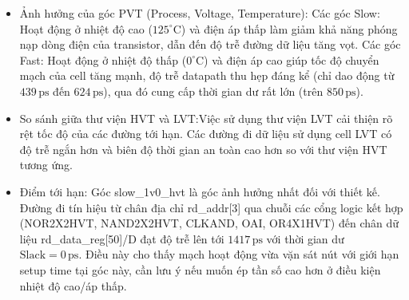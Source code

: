 \documentclass[12pt,a4paper,oneside]{book}
\begin{document}
\begin{itemize}
    \item Ảnh hưởng của góc PVT (Process, Voltage, Temperature): Các góc Slow: Hoạt động ở nhiệt độ cao ($125^\circ\text{C}$) và điện áp thấp làm giảm khả năng phóng nạp dòng điện của transistor, dẫn đến độ trễ đường dữ liệu tăng vọt. Các góc Fast: Hoạt động ở nhiệt độ thấp ($0^\circ\text{C}$) và điện áp cao giúp tốc độ chuyển mạch của cell tăng mạnh, độ trễ datapath thu hẹp đáng kể (chỉ dao động từ $439\,\text{ps}$ đến $624\,\text{ps}$), qua đó cung cấp thời gian dư rất lớn (trên $850\,\text{ps}$).
    \item So sánh giữa thư viện HVT và LVT:Việc sử dụng thư viện LVT cải thiện rõ rệt tốc độ của các đường tới hạn. Các đường đi dữ liệu sử dụng cell LVT có độ trễ ngắn hơn và biên độ thời gian an toàn cao hơn so với thư viện HVT tương ứng. 
    \item Điểm tới hạn: Góc slow\_1v0\_hvt là góc ảnh hưởng nhất đối với thiết kế. Đường đi tín hiệu từ chân địa chỉ rd\_addr[3] qua chuỗi các cổng logic kết hợp (NOR2X2HVT, NAND2X2HVT, CLKAND, OAI, OR4X1HVT) đến chân dữ liệu rd\_data\_reg[50]/D đạt độ trễ lên tới $1417\,\text{ps}$ với thời gian dư $\text{Slack} = 0\,\text{ps}$. Điều này cho thấy mạch hoạt động vừa vặn sát nút với giới hạn setup time tại góc này, cần lưu ý nếu muốn ép tần số cao hơn ở điều kiện nhiệt độ cao/áp thấp.
\end{itemize}
\end{document}
